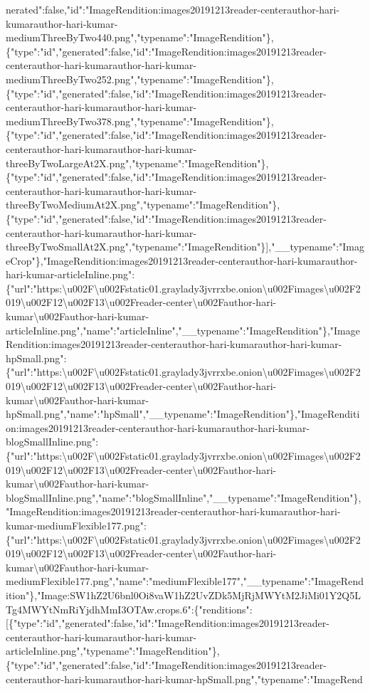 nerated":false,"id":"ImageRendition:images20191213reader-centerauthor-hari-kumarauthor-hari-kumar-mediumThreeByTwo440.png","typename":"ImageRendition"\},\{"type":"id","generated":false,"id":"ImageRendition:images20191213reader-centerauthor-hari-kumarauthor-hari-kumar-mediumThreeByTwo252.png","typename":"ImageRendition"\},\{"type":"id","generated":false,"id":"ImageRendition:images20191213reader-centerauthor-hari-kumarauthor-hari-kumar-mediumThreeByTwo378.png","typename":"ImageRendition"\},\{"type":"id","generated":false,"id":"ImageRendition:images20191213reader-centerauthor-hari-kumarauthor-hari-kumar-threeByTwoLargeAt2X.png","typename":"ImageRendition"\},\{"type":"id","generated":false,"id":"ImageRendition:images20191213reader-centerauthor-hari-kumarauthor-hari-kumar-threeByTwoMediumAt2X.png","typename":"ImageRendition"\},\{"type":"id","generated":false,"id":"ImageRendition:images20191213reader-centerauthor-hari-kumarauthor-hari-kumar-threeByTwoSmallAt2X.png","typename":"ImageRendition"\}{]},"\_\_typename":"ImageCrop"\},"ImageRendition:images20191213reader-centerauthor-hari-kumarauthor-hari-kumar-articleInline.png":\{"url":"https:\textbackslash{}u002F\textbackslash{}u002Fstatic01.graylady3jvrrxbe.onion\textbackslash{}u002Fimages\textbackslash{}u002F2019\textbackslash{}u002F12\textbackslash{}u002F13\textbackslash{}u002Freader-center\textbackslash{}u002Fauthor-hari-kumar\textbackslash{}u002Fauthor-hari-kumar-articleInline.png","name":"articleInline","\_\_typename":"ImageRendition"\},"ImageRendition:images20191213reader-centerauthor-hari-kumarauthor-hari-kumar-hpSmall.png":\{"url":"https:\textbackslash{}u002F\textbackslash{}u002Fstatic01.graylady3jvrrxbe.onion\textbackslash{}u002Fimages\textbackslash{}u002F2019\textbackslash{}u002F12\textbackslash{}u002F13\textbackslash{}u002Freader-center\textbackslash{}u002Fauthor-hari-kumar\textbackslash{}u002Fauthor-hari-kumar-hpSmall.png","name":"hpSmall","\_\_typename":"ImageRendition"\},"ImageRendition:images20191213reader-centerauthor-hari-kumarauthor-hari-kumar-blogSmallInline.png":\{"url":"https:\textbackslash{}u002F\textbackslash{}u002Fstatic01.graylady3jvrrxbe.onion\textbackslash{}u002Fimages\textbackslash{}u002F2019\textbackslash{}u002F12\textbackslash{}u002F13\textbackslash{}u002Freader-center\textbackslash{}u002Fauthor-hari-kumar\textbackslash{}u002Fauthor-hari-kumar-blogSmallInline.png","name":"blogSmallInline","\_\_typename":"ImageRendition"\},"ImageRendition:images20191213reader-centerauthor-hari-kumarauthor-hari-kumar-mediumFlexible177.png":\{"url":"https:\textbackslash{}u002F\textbackslash{}u002Fstatic01.graylady3jvrrxbe.onion\textbackslash{}u002Fimages\textbackslash{}u002F2019\textbackslash{}u002F12\textbackslash{}u002F13\textbackslash{}u002Freader-center\textbackslash{}u002Fauthor-hari-kumar\textbackslash{}u002Fauthor-hari-kumar-mediumFlexible177.png","name":"mediumFlexible177","\_\_typename":"ImageRendition"\},"Image:SW1hZ2U6bnl0Oi8vaW1hZ2UvZDk5MjRjMWYtM2JiMi01Y2Q5LTg4MWYtNmRiYjdhMmI3OTAw.crops.6":\{"renditions":{[}\{"type":"id","generated":false,"id":"ImageRendition:images20191213reader-centerauthor-hari-kumarauthor-hari-kumar-articleInline.png","typename":"ImageRendition"\},\{"type":"id","generated":false,"id":"ImageRendition:images20191213reader-centerauthor-hari-kumarauthor-hari-kumar-hpSmall.png","typename":"ImageRend